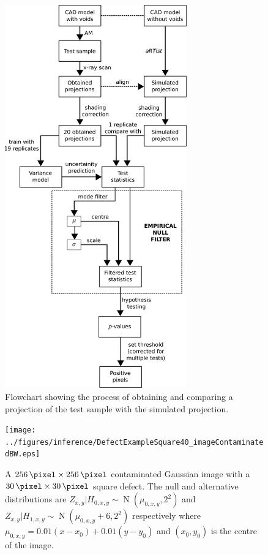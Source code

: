 \documentclass{article}
\DeclareMathOperator{\normal}{N}
\begin{document}
\begin{figure}
  \centering
  \includegraphics[width=0.7\textwidth]{../figures/flowchart.pdf}
  \caption{Flowchart showing the process of obtaining and comparing a projection of the test sample with the simulated projection.}
  \label{fig:flowchart}
\end{figure}

\begin{figure}
  \centering
  \texttt{[image: ../figures/inference/DefectExampleSquare40\_imageContaminatedBW.eps]}
  \caption{A $\SI{256}{\pixel}\times \SI{256}{\pixel}$ contaminated Gaussian image with a $\SI{30}{\pixel} \times \SI{30}{\pixel}$ square defect. The null and alternative distributions are $Z_{x,y}|H_{0,x,y}\sim\normal(\mu_{0,x,y},2^2)$ and $Z_{x,y}|H_{1,x,y}\sim\normal(\mu_{0,x,y}+6,2^2)$ respectively where $\mu_{0,x,y}=0.01(x-x_0)+0.01(y-y_0)$ and $(x_0,y_0)$ is the centre of the image.}
  \label{fig:inference_defectSquare2Example}
\end{figure}
\end{document}
